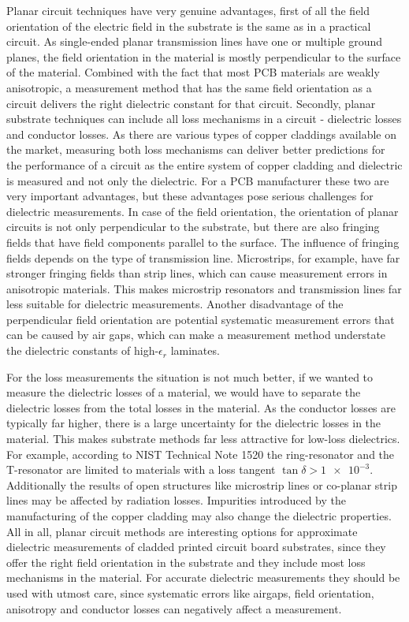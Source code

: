 Planar circuit techniques have very genuine advantages, first of all the field orientation of the electric field in the substrate is the same as in a practical circuit. As single-ended planar transmission lines have one or multiple ground planes, the field orientation in the material is mostly perpendicular to the surface of the material. Combined with the fact that most PCB materials are weakly anisotropic, a measurement method that has the same field orientation as a circuit delivers the right dielectric constant for that circuit. Secondly, planar substrate techniques can include all loss mechanisms in a circuit - dielectric losses and conductor losses. As there are various types of copper claddings available on the market, measuring both loss mechanisms can deliver better predictions for the performance of a circuit as the entire system of copper cladding and dielectric is measured and not only the dielectric. For a PCB manufacturer these two are very important advantages, but these advantages pose serious challenges for dielectric measurements. In case of the field orientation, the orientation of planar circuits is not only perpendicular to the substrate, but there are also fringing fields that have field components parallel to the surface. The influence of fringing fields depends on the type of transmission line. Microstrips, for example, have far stronger fringing fields than strip lines, which can cause measurement errors in anisotropic materials. This makes microstrip resonators and transmission lines far less suitable for dielectric measurements. Another disadvantage of the perpendicular field orientation are potential systematic measurement errors that can be caused by air gaps, which can make a measurement method understate the dielectric constants of high-$\epsilon_r$ laminates.

For the loss measurements the situation is not much better, if we wanted to measure the dielectric losses of a material, we would have to separate the dielectric losses from the total losses in the material. As the conductor losses are typically far higher, there is a large uncertainty for the dielectric losses in the material. This makes substrate methods far less attractive for low-loss dielectrics. For example, according to NIST Technical Note 1520 \cite{tn1520} the ring-resonator and the T-resonator are limited to materials with a loss tangent $\tan\delta>\num{1e-3}$. Additionally the results of open structures like microstrip lines or co-planar strip lines may be affected by radiation losses. Impurities introduced by the manufacturing of the copper cladding may also change the dielectric properties. All in all, planar circuit methods are interesting options for approximate dielectric measurements of cladded printed circuit board substrates, since they offer the right field orientation in the substrate and they include most loss mechanisms in the material. For accurate dielectric measurements they should be used with utmost care, since systematic errors like airgaps, field orientation, anisotropy and conductor losses can negatively affect a measurement.
